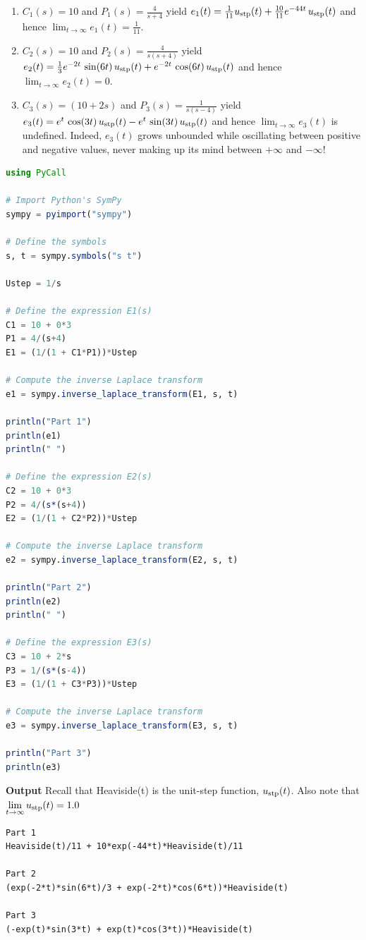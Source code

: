  \begin{enumerate}
\renewcommand{\labelenumi}{(\alph{enumi})}
\setlength{\itemsep}{.2cm}
\item $C_1(s) = 10$ and $P_1(s) = \frac{4}{s+4}$ yield $e_1(t) = \frac{1}{11} u_{\rm stp}(t) + \frac{10}{11}  e^{-44 t} \, u_{\rm stp}(t)$ and hence $\displaystyle \lim_{t\to \infty} e_1(t) = \frac{1}{11}.$

\item $C_2(s)= 10$ and $P_2(s) = \frac{4}{s(s+4)}$ yield $e_2(t) = \frac{1}{3}e^{-2t} \, \sin(6t)\, u_{\rm stp}(t) + e^{-2t} \, \cos(6t) \, u_{\rm stp}(t)$ and hence $\displaystyle \lim_{t\to \infty} e_2(t) = 0.$

\item $C_3(s)= (10 + 2s)$ and $P_3(s) = \frac{1}{s(s-4)}$  yield $e_3(t) = e^{t} \, \cos(3t)\, u_{\rm stp}(t) - e^{t} \, \sin(3t)\, u_{\rm stp}(t)$ and hence $\displaystyle \lim_{t\to \infty} e_3(t)$ is undefined. Indeed, $e_3(t)$ grows unbounded while oscillating between positive and negative values, never making up its mind between $+\infty$ and $-\infty$!
\end{enumerate}

\begin{lstlisting}[language=Julia,style=mystyle]
using PyCall

# Import Python's SymPy
sympy = pyimport("sympy")

# Define the symbols
s, t = sympy.symbols("s t")

Ustep = 1/s

# Define the expression E1(s)
C1 = 10 + 0*3
P1 = 4/(s+4)
E1 = (1/(1 + C1*P1))*Ustep

# Compute the inverse Laplace transform
e1 = sympy.inverse_laplace_transform(E1, s, t)

println("Part 1")
println(e1)
println(" ")

# Define the expression E2(s)
C2 = 10 + 0*3
P2 = 4/(s*(s+4))
E2 = (1/(1 + C2*P2))*Ustep

# Compute the inverse Laplace transform
e2 = sympy.inverse_laplace_transform(E2, s, t)

println("Part 2")
println(e2)
println(" ")

# Define the expression E3(s)
C3 = 10 + 2*s
P3 = 1/(s*(s-4))
E3 = (1/(1 + C3*P3))*Ustep

# Compute the inverse Laplace transform
e3 = sympy.inverse_laplace_transform(E3, s, t)

println("Part 3")
println(e3)
\end{lstlisting}
\textbf{Output} Recall that Heaviside(t) is the unit-step function, $u_{\rm stp}(t) $. Also note that $\displaystyle \lim_{t \to \infty} u_{\rm stp}(t) = 1.0$
\begin{verbatim}
Part 1
Heaviside(t)/11 + 10*exp(-44*t)*Heaviside(t)/11
 
Part 2
(exp(-2*t)*sin(6*t)/3 + exp(-2*t)*cos(6*t))*Heaviside(t)
 
Part 3
(-exp(t)*sin(3*t) + exp(t)*cos(3*t))*Heaviside(t)
\end{verbatim}

